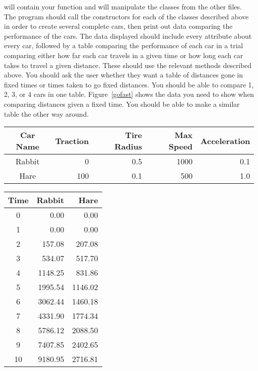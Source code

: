 \documentclass[11pt]{cselabheader}
\begin{document}
\begin{ex}
   will contain your  function and will
  manipulate the classes from the other files. The program should call the
  constructors for each of the classes described above in order to create
  several complete cars, then print out data comparing the performance of the
  cars. The data displayed should include every attribute about every car,
  followed by a table comparing the performance of each car in a trial
  comparing either how far each car travels in a given time or how long each
  car takes to travel a given distance. These should use the relevant methods
  described above. You should ask the user whether they want a table of distances
  gone in fixed times or times taken to go fixed distances. You should be able
  to compare 1, 2, 3, or 4 cars in one table. Figure~\ref{gofast} shows the
  data you need to show when comparing distances given a fixed time. You should be
  able to make a similar table the other way around.
  
  \begin{center}
    \begin{tabular}{crrrr}
    \toprule
    Car Name & Traction & Tire Radius & Max Speed & Acceleration\\
    \midrule
    Rabbit & 0 & 0.5 & 1000 & 0.1\\
    Hare & 100 & 0.1 & 500 & 1.0\\
    \bottomrule
    \end{tabular}
  \end{center}
  
  \begin{center}
    \begin{tabular}{crr}
    \toprule
    Time & Rabbit & Hare\\
    \midrule
    0 & 0.00 & 0.00\\
    1 & 0.00 & 0.00\\
    2 & 157.08 & 207.08\\
    3 & 534.07 & 517.70\\
    4 & 1148.25 & 831.86\\
    5 & 1995.54 & 1146.02\\
    6 & 3062.44 & 1460.18\\
    7 & 4331.90 & 1774.34\\
    8 & 5786.12 & 2088.50\\
    9 & 7407.85 & 2402.65\\
    10 & 9180.95 & 2716.81\\
    \bottomrule
    \end{tabular}
    \label{gofast}
  \end{center}
  

\end{ex}
\end{document}
